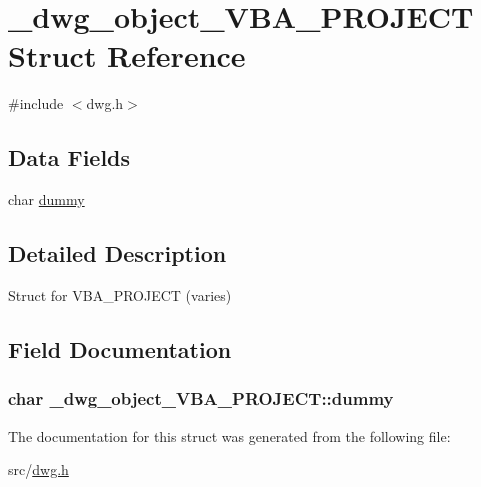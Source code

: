 \hypertarget{struct__dwg__object__VBA__PROJECT}{\section{\-\_\-dwg\-\_\-object\-\_\-\-V\-B\-A\-\_\-\-P\-R\-O\-J\-E\-C\-T \-Struct \-Reference}
\label{struct__dwg__object__VBA__PROJECT}
}


{\ttfamily \#include $<$dwg.\-h$>$}

\subsection*{\-Data \-Fields}
\begin{DoxyCompactItemize}
\item 
char \hyperlink{struct__dwg__object__VBA__PROJECT_a24ab51c800691333edcec3b8ec2f2d32}{dummy}
\end{DoxyCompactItemize}


\subsection{\-Detailed \-Description}
\-Struct for \-V\-B\-A\-\_\-\-P\-R\-O\-J\-E\-C\-T (varies) 

\subsection{\-Field \-Documentation}
\hypertarget{struct__dwg__object__VBA__PROJECT_a24ab51c800691333edcec3b8ec2f2d32}{
\subsubsection[{dummy}]{\setlength{\rightskip}{0pt plus 5cm}char {\bf \-\_\-dwg\-\_\-object\-\_\-\-V\-B\-A\-\_\-\-P\-R\-O\-J\-E\-C\-T\-::dummy}}}\label{struct__dwg__object__VBA__PROJECT_a24ab51c800691333edcec3b8ec2f2d32}


\-The documentation for this struct was generated from the following file\-:\begin{DoxyCompactItemize}
\item 
src/\hyperlink{dwg_8h}{dwg.\-h}\end{DoxyCompactItemize}
